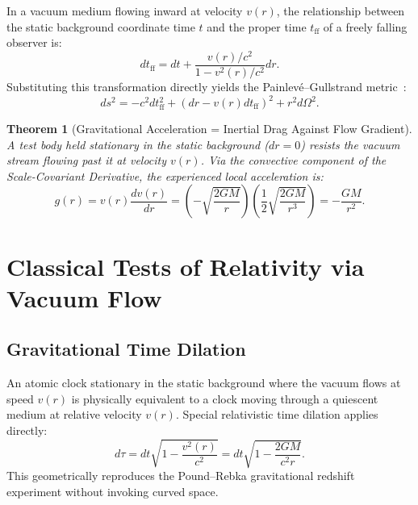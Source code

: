 \documentclass[11pt,a4paper]{article}
\newtheorem{theorem}{Theorem}[section]
\begin{document}
In a vacuum medium flowing inward at velocity $v(r)$, the relationship between the static background coordinate time $t$ and the proper time $t_{\mathrm{ff}}$ of a freely falling observer is:
\begin{equation}
    dt_{\mathrm{ff}} = dt + \frac{v(r)/c^2}{1 - v^2(r)/c^2} dr.
    \label{eq:donusum}
\end{equation}
Substituting this transformation directly yields the Painlev\'e--Gullstrand metric~\cite{painleve1921,gullstrand1922}:
\begin{equation}
    ds^2 = -c^2 dt_{\mathrm{ff}}^2 + \left( dr - v(r) dt_{\mathrm{ff}} \right)^2 + r^2 d\Omega^2.
    \label{eq:pg_metrik}
\end{equation}

\begin{theorem}[Gravitational Acceleration = Inertial Drag Against Flow Gradient]
    \label{thm:ivme_eylemsizlik_p1}
    A test body held stationary in the static background ($dr = 0$) resists the vacuum stream flowing past it at velocity $v(r)$. Via the convective component of the Scale-Covariant Derivative, the experienced local acceleration is:
    \begin{equation}
        g(r) = v(r) \frac{dv(r)}{dr} = \left(-\sqrt{\frac{2GM}{r}}\right) \left(\frac{1}{2}\sqrt{\frac{2GM}{r^3}}\right) = -\frac{GM}{r^2}.
        \label{eq:ivme_ispat}
    \end{equation}
\end{theorem}

\section{Classical Tests of Relativity via Vacuum Flow}
\label{sec:testler}

\subsection{Gravitational Time Dilation}
An atomic clock stationary in the static background where the vacuum flows at speed $v(r)$ is physically equivalent to a clock moving through a quiescent medium at relative velocity $v(r)$. Special relativistic time dilation applies directly:
\begin{equation}
    d\tau = dt \sqrt{1 - \frac{v^2(r)}{c^2}} = dt \sqrt{1 - \frac{2GM}{c^2 r}}.
    \label{eq:zaman_genislemesi}
\end{equation}
This geometrically reproduces the Pound--Rebka gravitational redshift experiment without invoking curved space.
\end{document}
